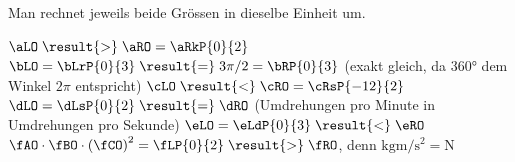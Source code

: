 Man rechnet jeweils beide Grössen in dieselbe Einheit um.
\begin{abcliste}
\abc $\aLO \;\result{>}\; \aRO = \aRkP{0}{2}$
\abc $\bLO = \bLrP{0}{3} \;\result{=}\; 3\pi/2 = \bRP{0}{3}$ (exakt gleich, da $\ang{360}$ dem Winkel $2\pi$ entspricht)
\abc $\cLO \;\result{<}\; \cRO = \cRsP{-12}{2}$
\abc $\dLO = \dLsP{0}{2} \;\result{=}\; \dRO$ (Umdrehungen pro Minute in Umdrehungen pro Sekunde)
\abc $\eLO = \eLdP{0}{3} \;\result{<}\; \eRO$
\abc $\fAO\cdot\fBO\cdot\left(\fCO\right)^2 = \fLP{0}{2} \;\result{>}\; \fRO$, denn $\si{\kilo\gram\meter\per\second\squared} = \si{\newton}$
\end{abcliste}
